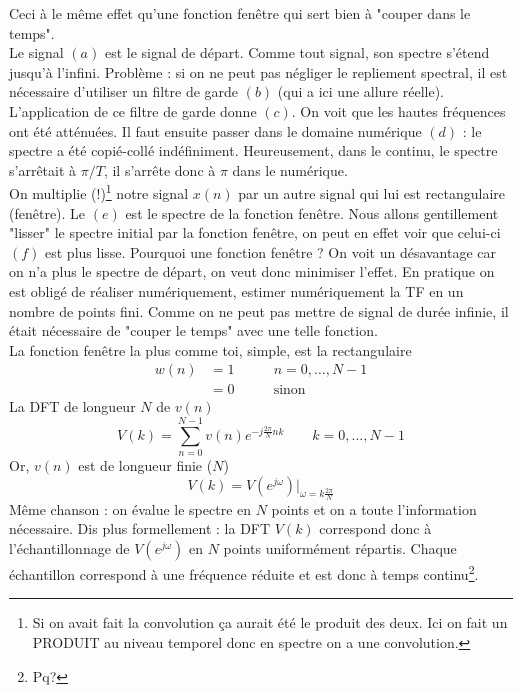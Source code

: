 	Ceci à le même effet qu'une fonction fenêtre qui sert bien à "couper dans le temps".\\
		
	Le signal $(a)$ est le signal de départ. Comme tout signal, son spectre s'étend jusqu'à l'infini. 
	Problème : si on ne peut pas négliger le repliement spectral, il est nécessaire d'utiliser un 
	filtre de garde $(b)$ (qui a ici une allure réelle). L'application de ce filtre de garde donne 
	$(c)$. On voit que les hautes fréquences ont été atténuées. Il faut ensuite passer dans le domaine 
	numérique $(d)$ : le spectre a été copié-collé indéfiniment. Heureusement, dans le continu, le 
	spectre s'arrêtait à $\pi/T$, il s'arrête donc à $\pi$ dans le numérique.\\

\newpage
	 On multiplie (\!!)\footnote{
	Si on avait fait la convolution ça aurait été le produit des deux. Ici on fait un PRODUIT au niveau 
	temporel donc en spectre on a une convolution.} notre signal $x(n)$ par un autre signal qui lui est
	rectangulaire (fenêtre). Le $(e)$ est le spectre de la fonction fenêtre. Nous allons gentillement 
	"lisser" le spectre initial par la fonction fenêtre, on peut en effet voir que celui-ci $(f)$ est 
	plus lisse. Pourquoi une fonction fenêtre ? On voit un désavantage car on n'a plus le spectre de départ, 
	on veut donc minimiser l'effet. En pratique on est obligé de réaliser numériquement, estimer 
	numériquement la TF en un nombre de points fini. Comme on ne peut pas mettre de signal de durée infinie, 
	il était nécessaire de "couper le temps" avec une telle fonction.\\
	
	La fonction fenêtre la plus comme toi, simple, est la rectangulaire
	\begin{equation}
	\begin{array}{lll}
	w(n) &= 1&\qquad n=0,\dots,N-1\\
	&=0&\qquad\text{sinon}
	\end{array}
	\end{equation}
	La DFT de longueur $N$ de $v(n)$
	\begin{equation}
	V(k) = \sum_{n=0}^{N-1} v(n)e^{-j\frac{2\pi}{N}nk}\qquad k=0,\dots,N-1
	\end{equation}
	Or, $v(n)$ est de longueur finie ($N$)
	\begin{equation}
	V(k) = V(e^{j\omega})|_{\omega=k\frac{2\pi}{N}}
	\end{equation}
	Même chanson : on évalue le spectre en $N$ points et on a toute l'information nécessaire. Dis 
	plus formellement : la DFT $V(k)$ correspond donc à l’échantillonnage de $V(e^{j\omega})$ en $N$ points
	uniformément répartis. Chaque échantillon correspond à une fréquence réduite et est donc à temps 
	continu\footnote{Pq?}.\\
	
